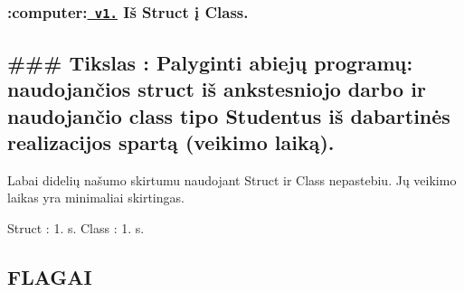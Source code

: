 \subsubsection*{\+:computer\+:\href{https://github.com/odiraitis/TRECIASND/releases/tag/v1.1}{\texttt{ v1.}} Iš Struct į Class.}

\subsection*{\#\#\# Tikslas \+: Palyginti abiejų programų\+: naudojančios struct iš ankstesniojo darbo ir naudojančio class tipo Studentus iš dabartinės realizacijos spartą (veikimo laiką). }


\begin{DoxyCode}{0}
\DoxyCodeLine{\{}
\DoxyCodeLine{   }
\DoxyCodeLine{    \}}
\DoxyCodeLine{    \{}
\DoxyCodeLine{    \}}
\DoxyCodeLine{    \{}
\DoxyCodeLine{    \}}
\DoxyCodeLine{    \{}
\DoxyCodeLine{    \}}
\DoxyCodeLine{    \{}
\DoxyCodeLine{    \}}
\DoxyCodeLine{\};}
\end{DoxyCode}
 Labai didelių našumo skirtumu naudojant Struct ir Class nepastebiu. Jų veikimo laikas yra minimaliai skirtingas.

Struct \+: 1. s. Class \+: 1. s.





\subsection*{F\+L\+A\+G\+AI}

